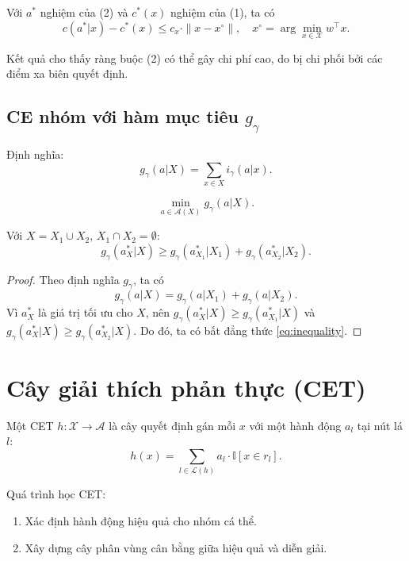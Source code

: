 \begin{proposition}
Với $a^*$ nghiệm của (2) và $c^*(x)$ nghiệm của (1), ta có
\[
c(a^*|x) - c^*(x) \le c_x \cdot \|x - x^\circ\|,
\quad x^\circ = \arg\min_{x \in \mathcal{X}} w^\top x.
\]
\end{proposition}

\noindent Kết quả cho thấy ràng buộc (2) có thể gây chi phí cao, do bị chi phối bởi các điểm xa biên quyết định.

\subsection{CE nhóm với hàm mục tiêu $g_\gamma$}
Định nghĩa:
\[
g_\gamma(a|X) = \sum_{x \in X} i_\gamma(a|x).
\]

\begin{problem}[CE nhóm]
\[
\min_{a \in \mathcal{A}(X)} g_\gamma(a|X).
\]
\end{problem}

\begin{proposition}
\label{prop:monotonicity}
Với $X = X_1 \cup X_2$, $X_1 \cap X_2 = \emptyset$:
\begin{equation}
\label{eq:inequality}
g_\gamma(a^*_X|X) \ge g_\gamma(a^*_{X_1}|X_1) + g_\gamma(a^*_{X_2}|X_2).
\end{equation}
\end{proposition}

\begin{proof}
Theo định nghĩa $g_\gamma$, ta có
\[
g_\gamma(a|X) = g_\gamma(a|X_1) + g_\gamma(a|X_2).
\]
Vì $a^*_X$ là giá trị tối ưu cho $X$, nên $g_\gamma(a^*_X|X) \ge g_\gamma(a^*_{X_1}|X)$ và $g_\gamma(a^*_X|X) \ge g_\gamma(a^*_{X_2}|X)$.
Do đó, ta có bất đẳng thức \eqref{eq:inequality}.
\end{proof}

\section{Cây giải thích phản thực (CET)}

Một CET $h: \mathcal{X} \to \mathcal{A}$ là cây quyết định gán mỗi $x$ với một hành động $a_l$ tại nút lá $l$:  
\[
h(x) = \sum_{l \in \mathcal{L}(h)} a_l \cdot \mathbb{I}[x \in r_l].
\]

\noindent Quá trình học CET:
\begin{enumerate}[label=(\roman*)]
    \item Xác định hành động hiệu quả cho nhóm cá thể.
    \item Xây dựng cây phân vùng cân bằng giữa hiệu quả và diễn giải.
\end{enumerate}

